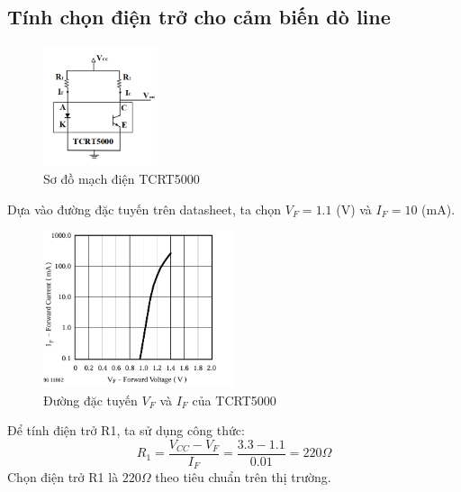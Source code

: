         \subsection{Tính chọn điện trở cho cảm biến dò line}
            \begin{figure}[H]
                \centering
                \includegraphics[width=0.3\textwidth]{pictures/chapter4/c4_p2_TCRT5000Schematic.png}
                \caption{Sơ đồ mạch điện TCRT5000}
                \label{fig:4-4}
            \end{figure}
            \hspace*{0.6cm}Dựa vào đường đặc tuyến trên datasheet, ta chọn $V_{F} = 1.1$ (V) và $I_{F} = 10$ (mA).\\
            \begin{figure}[H]
                \centering
                \includegraphics[width=0.5\textwidth]{pictures/chapter4/c4_p3_Voltage&Current.png}
                \caption{Đường đặc tuyến $V_{F}$ và $I_{F}$ của TCRT5000}
                \label{fig:4-5}
            \end{figure}
            Để tính điện trở R1, ta sử dụng công thức:
            \begin{equation}
                R_{1} = \frac{V_{CC} - V_{F}}{I_{F}} = \frac{3.3 - 1.1}{0.01} = 220 \Omega
                \label{eq:4-1}
            \end{equation}
            \hspace*{0.6cm}Chọn điện trở R1 là $220 \Omega$ theo tiêu chuẩn trên thị trường.\\[0.4cm]
